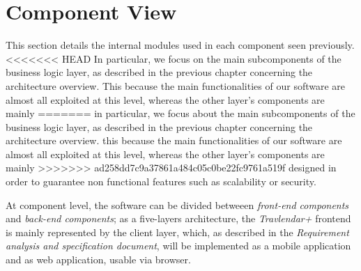\section{Component View}


This section details the internal modules used in each component seen previously.
<<<<<<< HEAD
In particular, we focus on the main subcomponents of the business logic layer, as described in the previous chapter concerning the architecture overview. 
This because the main functionalities  of our software are almost all exploited at this level, whereas the other layer's components are mainly
=======
in particular, we focus about the main subcomponents of the business logic layer, as described in the previous chapter concerning the architecture overview. 
this because the main functionalities  of our software are almost all exploited at this level, whereas the other layer's components are mainly
>>>>>>> ad258dd7c9a37861a484c05c0be22fc9761a519f
designed in order to guarantee non functional features such as scalability or security. 

At component level, the software can be divided betweeen \emph{front-end components} and \emph{back-end components}; as a five-layers architecture, the \emph{Travlendar+} frontend is mainly represented by the client layer, which, as described in the \emph{Requirement analysis and specification document}, will be implemented as a mobile application and as web application, usable via browser.
